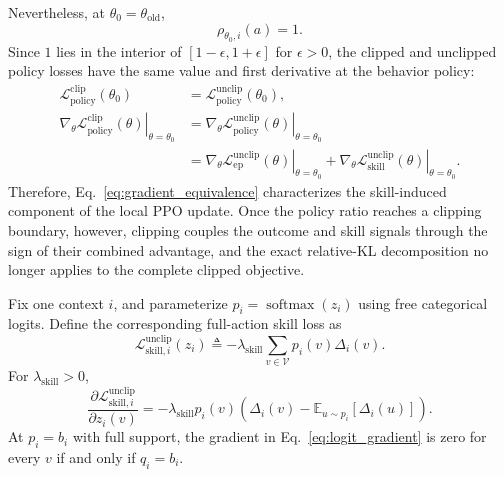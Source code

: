 \documentclass{llmxive}
\begin{document}
Nevertheless, at
\(\theta_0=\theta_{\mathrm{old}}\),
\[
 \rho_{\theta_0,i}(a)=1.
\]
Since \(1\) lies in the interior of
\([1-\epsilon,1+\epsilon]\) for \(\epsilon>0\), the clipped and unclipped
policy losses have the same value and first derivative at the behavior
policy:
\begin{equation*}
\begin{aligned}
 \mathcal L_{\mathrm{policy}}^{\mathrm{clip}}(\theta_0)
 &=
 \mathcal L_{\mathrm{policy}}^{\mathrm{unclip}}(\theta_0),
 \\
 \left.
 \nabla_\theta
 \mathcal L_{\mathrm{policy}}^{\mathrm{clip}}(\theta)
 \right|_{\theta=\theta_0}
 &=
 \left.
 \nabla_\theta
 \mathcal L_{\mathrm{policy}}^{\mathrm{unclip}}(\theta)
 \right|_{\theta=\theta_0}
 \\
 &=
 \left.
 \nabla_\theta
 \mathcal L_{\mathrm{ep}}^{\mathrm{unclip}}(\theta)
 \right|_{\theta=\theta_0}
 +
 \left.
 \nabla_\theta
 \mathcal L_{\mathrm{skill}}^{\mathrm{unclip}}(\theta)
 \right|_{\theta=\theta_0}.
\end{aligned}
\end{equation*}
Therefore,
Eq.~\ref{eq:gradient_equivalence} characterizes the skill-induced
component of the local PPO update. Once the policy ratio reaches a clipping
boundary, however, clipping couples the outcome and skill signals through
the sign of their combined advantage, and the exact relative-KL
decomposition no longer applies to the complete clipped objective.


\begin{corollary}
\label{cor:dense_signal}
Fix one context \(i\), and parameterize
\(p_i=\operatorname{softmax}(z_i)\) using free categorical logits. Define
the corresponding full-action skill loss as
\begin{equation*}
 \mathcal L_{\mathrm{skill},i}^{\mathrm{unclip}}(z_i)
 \triangleq
 -
 \lambda_{\mathrm{skill}}
 \sum_{v\in\mathcal V}
 p_i(v)\Delta_i(v).
\end{equation*}
For \(\lambda_{\mathrm{skill}}>0\),
\begin{equation}
 \frac{
   \partial
   \mathcal L_{\mathrm{skill},i}^{\mathrm{unclip}}
 }{
   \partial z_i(v)
 }
 =
 -
 \lambda_{\mathrm{skill}}
 p_i(v)
 \left(
   \Delta_i(v)
   -
   \mathbb E_{u\sim p_i}[\Delta_i(u)]
 \right).
\label{eq:logit_gradient}
\end{equation}
At \(p_i=b_i\) with full support, the gradient in
Eq.~\ref{eq:logit_gradient} is zero for every \(v\) if and only if
\(q_i=b_i\).
\end{corollary}
\end{document}

